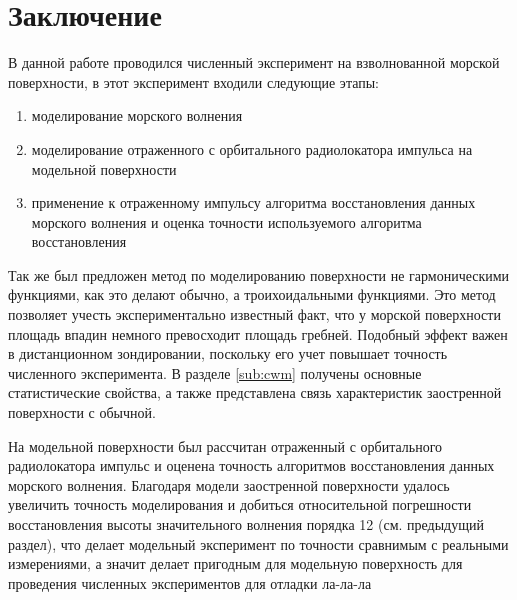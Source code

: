 \section{Заключение}%
\label{sec:zakliuchenie}

В данной работе проводился численный эксперимент на взволнованной морской
поверхности, в этот эксперимент входили следующие этапы:
\begin{enumerate}
    \item моделирование морского волнения
    \item моделирование отраженного с орбитального радиолокатора импульса на модельной поверхности
    \item применение к отраженному импульсу алгоритма восстановления данных
    морского волнения и оценка точности используемого алгоритма
    восстановления
\end{enumerate}

Так же был предложен метод по моделированию поверхности не гармоническими
функциями, как это делают обычно, а троихоидальными функциями. Это метод
позволяет учесть экспериментально известный факт, что у морской поверхности
площадь впадин немного превосходит площадь гребней. Подобный эффект важен в
дистанционном зондировании, поскольку его учет повышает точность численного
эксперимента.  В разделе \ref{sub:cwm} получены основные статистические
свойства, а также представлена связь характеристик заостренной поверхности с
обычной.


На модельной поверхности был рассчитан отраженный с орбитального радиолокатора
импульс и оценена точность алгоритмов восстановления данных морского волнения. 
Благодаря модели заостренной поверхности удалось увеличить точность
моделирования и добиться относительной погрешности восстановления высоты
значительного волнения порядка 12 (см. предыдущий раздел), что делает
модельный эксперимент по точности сравнимым с реальными измерениями, а значит
делает пригодным для модельную поверхность для проведения численных
экспериментов для отладки ла-ла-ла

